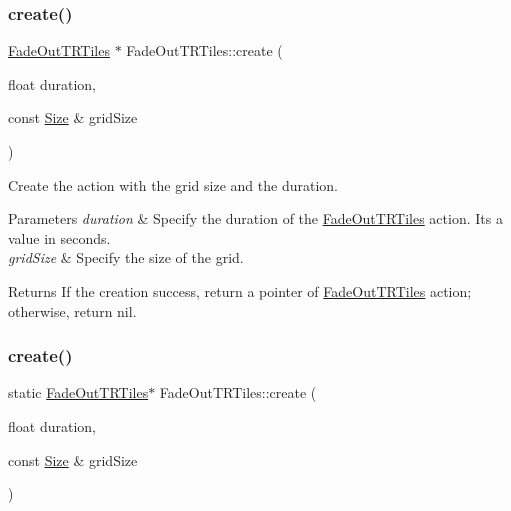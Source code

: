\mbox{\label{classFadeOutTRTiles_ab885c7c48f20e0182c0a29729827252a}} 
\subsubsection{\texorpdfstring{create()}{create()}\hspace{0.1cm}{\footnotesize\ttfamily [1/2]}}
{\footnotesize\ttfamily \hyperlink{classFadeOutTRTiles}{Fade\+Out\+T\+R\+Tiles} $\ast$ Fade\+Out\+T\+R\+Tiles\+::create (\begin{DoxyParamCaption}\item[{float}]{duration,  }\item[{const \hyperlink{classSize}{Size} \&}]{grid\+Size }\end{DoxyParamCaption})\hspace{0.3cm}{\ttfamily [static]}}



Create the action with the grid size and the duration. 


\begin{DoxyParams}{Parameters}
{\em duration} & Specify the duration of the \hyperlink{classFadeOutTRTiles}{Fade\+Out\+T\+R\+Tiles} action. It\textquotesingle{}s a value in seconds. \\
\hline
{\em grid\+Size} & Specify the size of the grid. \\
\hline
\end{DoxyParams}
\begin{DoxyReturn}{Returns}
If the creation success, return a pointer of \hyperlink{classFadeOutTRTiles}{Fade\+Out\+T\+R\+Tiles} action; otherwise, return nil. 
\end{DoxyReturn}
\mbox{\label{classFadeOutTRTiles_a80f9dbf41d1034fde40bbfc7c6a5af53}} 
\subsubsection{\texorpdfstring{create()}{create()}\hspace{0.1cm}{\footnotesize\ttfamily [2/2]}}
{\footnotesize\ttfamily static \hyperlink{classFadeOutTRTiles}{Fade\+Out\+T\+R\+Tiles}$\ast$ Fade\+Out\+T\+R\+Tiles\+::create (\begin{DoxyParamCaption}\item[{float}]{duration,  }\item[{const \hyperlink{classSize}{Size} \&}]{grid\+Size }\end{DoxyParamCaption})\hspace{0.3cm}{\ttfamily [static]}}



